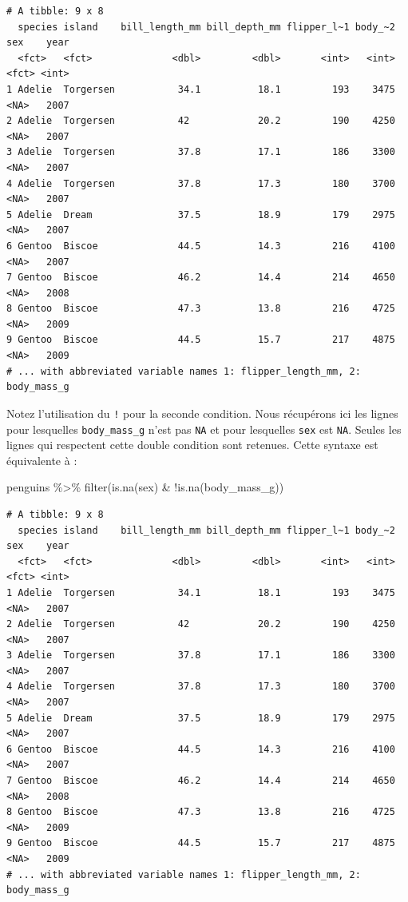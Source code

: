 \documentclass[
  letterpaper,
  DIV=11,
  numbers=noendperiod]{scrreprt}
\newenvironment{Shaded}{\begin{snugshade}}{\end{snugshade}}
\newcommand{\FunctionTok}[1]{\textcolor[rgb]{0.28,0.35,0.67}{#1}}
\newcommand{\NormalTok}[1]{\textcolor[rgb]{0.00,0.23,0.31}{#1}}
\newcommand{\SpecialCharTok}[1]{\textcolor[rgb]{0.37,0.37,0.37}{#1}}
\begin{document}
\begin{verbatim}
# A tibble: 9 x 8
  species island    bill_length_mm bill_depth_mm flipper_l~1 body_~2 sex    year
  <fct>   <fct>              <dbl>         <dbl>       <int>   <int> <fct> <int>
1 Adelie  Torgersen           34.1          18.1         193    3475 <NA>   2007
2 Adelie  Torgersen           42            20.2         190    4250 <NA>   2007
3 Adelie  Torgersen           37.8          17.1         186    3300 <NA>   2007
4 Adelie  Torgersen           37.8          17.3         180    3700 <NA>   2007
5 Adelie  Dream               37.5          18.9         179    2975 <NA>   2007
6 Gentoo  Biscoe              44.5          14.3         216    4100 <NA>   2007
7 Gentoo  Biscoe              46.2          14.4         214    4650 <NA>   2008
8 Gentoo  Biscoe              47.3          13.8         216    4725 <NA>   2009
9 Gentoo  Biscoe              44.5          15.7         217    4875 <NA>   2009
# ... with abbreviated variable names 1: flipper_length_mm, 2: body_mass_g
\end{verbatim}

Notez l'utilisation du \texttt{!} pour la seconde condition. Nous
récupérons ici les lignes pour lesquelles \texttt{body\_mass\_g} n'est
pas \texttt{NA} et pour lesquelles \texttt{sex} est \texttt{NA}. Seules
les lignes qui respectent cette double condition sont retenues. Cette
syntaxe est équivalente à :

\begin{Shaded}
\begin{Highlighting}[]
\NormalTok{penguins }\SpecialCharTok{\%\textgreater{}\%} 
  \FunctionTok{filter}\NormalTok{(}\FunctionTok{is.na}\NormalTok{(sex) }\SpecialCharTok{\&} \SpecialCharTok{!}\FunctionTok{is.na}\NormalTok{(body\_mass\_g))}
\end{Highlighting}
\end{Shaded}

\begin{verbatim}
# A tibble: 9 x 8
  species island    bill_length_mm bill_depth_mm flipper_l~1 body_~2 sex    year
  <fct>   <fct>              <dbl>         <dbl>       <int>   <int> <fct> <int>
1 Adelie  Torgersen           34.1          18.1         193    3475 <NA>   2007
2 Adelie  Torgersen           42            20.2         190    4250 <NA>   2007
3 Adelie  Torgersen           37.8          17.1         186    3300 <NA>   2007
4 Adelie  Torgersen           37.8          17.3         180    3700 <NA>   2007
5 Adelie  Dream               37.5          18.9         179    2975 <NA>   2007
6 Gentoo  Biscoe              44.5          14.3         216    4100 <NA>   2007
7 Gentoo  Biscoe              46.2          14.4         214    4650 <NA>   2008
8 Gentoo  Biscoe              47.3          13.8         216    4725 <NA>   2009
9 Gentoo  Biscoe              44.5          15.7         217    4875 <NA>   2009
# ... with abbreviated variable names 1: flipper_length_mm, 2: body_mass_g
\end{verbatim}
\end{document}
